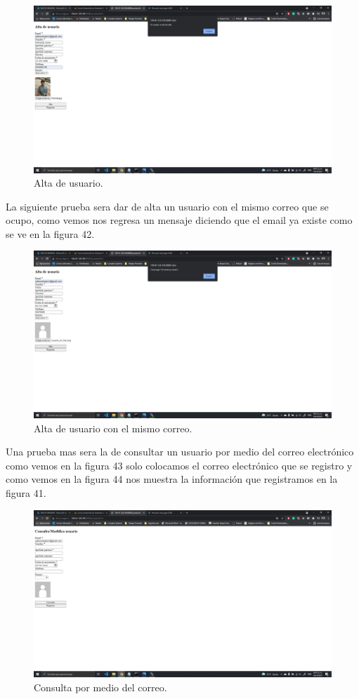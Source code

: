 \documentclass[11pt]{article}
\begin{document}
		\begin{figure}[H]
			\centering
			\includegraphics[scale=0.34]{resources/ULTIMO5.png}
			\caption{Alta de usuario.}\label{fig:picture}
		\end{figure}
		La siguiente prueba sera dar de alta un usuario con el mismo correo que se ocupo, como vemos nos regresa un mensaje diciendo que el email ya existe como se ve en la figura 42.
		\begin{figure}[H]
			\centering
			\includegraphics[scale=0.34]{resources/ULTIMO6.png}
			\caption{Alta de usuario con el mismo correo.}\label{fig:picture}
		\end{figure} 
		Una prueba mas sera la de consultar un usuario por medio del correo electrónico como vemos en la figura 43 solo colocamos el correo electrónico que se registro y como vemos en la figura 44 nos muestra la información que registramos en la figura 41.
		\begin{figure}[H]
			\centering
			\includegraphics[scale=0.34]{resources/ULTIMO7.1.png}
			\caption{Consulta por medio del correo.}\label{fig:picture}
		\end{figure}
\end{document}
